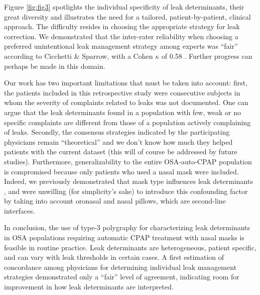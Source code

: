Figure \ref{fig:fig3} spotlights the individual specificity of leak determinants, their great diversity and illustrates the need for a tailored, patient-by-patient, clinical approach. The difficulty resides in choosing the appropriate strategy for leak correction. We demonstrated that the inter-rater reliability when choosing a preferred unintentional leak management strategy among experts was “fair” according to Cicchetti \& Sparrow, with a Cohen $\kappa$ of 0.58 \citep{cicchetti1981, cicchetti2001}. Further progress can perhaps be made in this domain.

Our work has two important limitations that must be taken into account: first, the patients included in this retrospective study were consecutive subjects in whom the severity of complaints related to leaks was not documented. One can argue that the leak determinants found in a population with few, weak or no specific complaints are different from those of a population actively complaining of leaks. Secondly, the consensus strategies indicated by the participating physicians remain “theoretical” and we don’t know how much they helped patients with the current dataset (this will of course be addressed by future studies). Furthermore, generalizability to the entire OSA-auto-CPAP population is compromised because only patients who used a nasal mask were included. Indeed, we previously demonstrated that mask type influences leak determinants \citep{lebret2018}, and were unwilling (for simplicity’s sake) to introduce this confounding factor by taking into account oronasal and nasal pillows, which are second-line interfaces. 

In conclusion, the use of type-3 polygraphy for characterizing leak determinants in OSA populations requiring automatic CPAP treatment with nasal masks is feasible in routine practice. Leak determinants are heterogeneous, patient specific, and can vary with leak thresholds in certain cases. A first estimation of concordance among physicians for determining individual leak management strategies demonstrated only a “fair” level of agreement, indicating room for improvement in how leak determinants are interpreted. 




